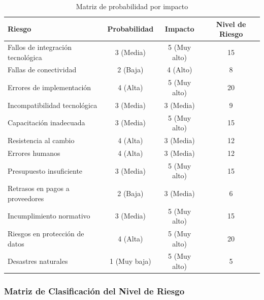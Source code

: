 \begin{table}[h!]
	\centering
	\begin{tabular}{|p{6cm}|c|c|c|}
		\hline
		\textbf{Riesgo}                & \textbf{Probabilidad} & \textbf{Impacto} & \textbf{Nivel de Riesgo} \\ \hline
		Fallos de integración tecnológica          & 3 (Media)             & 5 (Muy alto)       & 15                       \\ \hline
		Fallas de conectividad                     & 2 (Baja)              & 4 (Alto)           & 8                        \\ \hline
		Errores de implementación                  & 4 (Alta)              & 5 (Muy alto)       & 20                       \\ \hline
		Incompatibilidad tecnológica               & 3 (Media)             & 3 (Media)          & 9                        \\ \hline
		Capacitación inadecuada                    & 3 (Media)             & 5 (Muy alto)       & 15                       \\ \hline
		Resistencia al cambio                      & 4 (Alta)              & 3 (Media)          & 12                       \\ \hline
		Errores humanos                            & 4 (Alta)              & 3 (Media)          & 12                       \\ \hline
		Presupuesto insuficiente                   & 3 (Media)             & 5 (Muy alto)       & 15                       \\ \hline
		Retrasos en pagos a proveedores            & 2 (Baja)              & 3 (Media)          & 6                        \\ \hline
		Incumplimiento normativo                   & 3 (Media)             & 5 (Muy alto)       & 15                       \\ \hline
		Riesgos en protección de datos             & 4 (Alta)              & 5 (Muy alto)       & 20                       \\ \hline
		Desastres naturales                        & 1 (Muy baja)          & 5 (Muy alto)       & 5                        \\ \hline
	\end{tabular}
	\caption{Matriz de probabilidad por impacto}
	\label{tab:matriz_prob_impacto}
\end{table}
\newpage

\subsubsection*{Matriz de Clasificación del Nivel de Riesgo}


